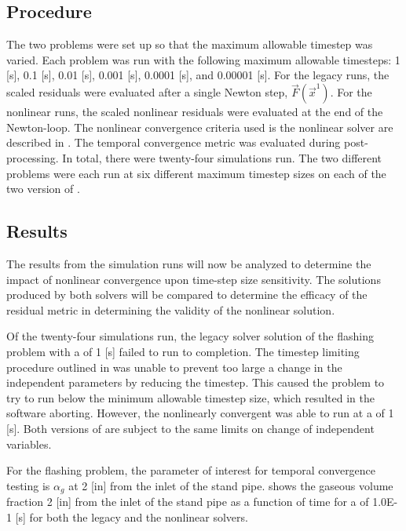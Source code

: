 \subsection{Procedure}
\label{subsect:procedures}

The two problems were set up so that the maximum allowable timestep was varied.
Each problem was run with the following maximum allowable timesteps: 1 [s], 0.1 [s], 0.01 [s], 0.001 [s], 0.0001 [s], and 0.00001 [s]. 
For the legacy runs, the scaled residuals were evaluated after a single Newton step, $\vec{F}(\vec{x}^{1})$.
For the nonlinear runs, the scaled nonlinear residuals were evaluated at the end of the Newton-loop.
The nonlinear convergence criteria used is the nonlinear solver are described in .
The temporal convergence metric was evaluated during post-processing.
In total, there were twenty-four simulations run.
The two different problems were each run at six different maximum timestep sizes on each of the two version of \cobra{}.

\subsection{Results}
\label{subsect:results}

The results from the simulation runs will now be analyzed to determine the impact of nonlinear convergence upon time-step size sensitivity.
The solutions produced by both solvers will be compared to determine the efficacy of the residual metric in determining the validity of the nonlinear solution.  

Of the twenty-four simulations run, the legacy solver solution of the flashing problem with a \dtmax{} of 1 [s] failed to run to completion.
The timestep limiting procedure outlined in   was unable to prevent too large a change in the independent parameters by reducing the timestep.
This caused the problem to try to run below the minimum allowable timestep size, which resulted in the software aborting.
However, the nonlinearly convergent \cobra{} was able to run at a \dtmax{} of 1 [s].
Both versions of \cobra{} are subject to the same limits on change of independent variables.

For the flashing problem, the parameter of interest for temporal convergence testing is $\alpha_g$ at 2 [in] from the inlet of the stand pipe.
 shows the gaseous volume fraction 2 [in] from the inlet of the stand pipe as a function of time for a \dtmax{} of 1.0E-1 [s] for both the legacy and the nonlinear solvers.


